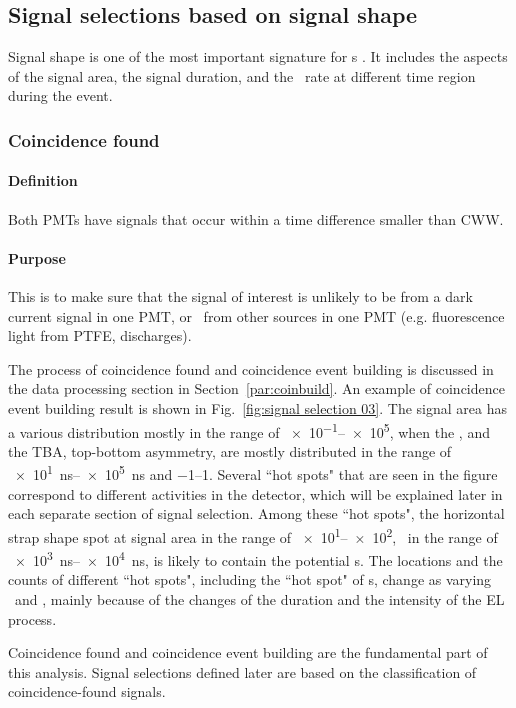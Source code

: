 \subsection{Signal selections based on signal shape}
Signal shape is one of the most important signature for \ees s . It includes the aspects of the signal area, the signal duration, and the \sphe\ rate at different time region during the event.
\subsubsection{Coincidence found}
\label{sec:cuts coindence found}
\paragraph{Definition}
Both PMTs have signals that occur within a time difference smaller than CWW. 
\paragraph{Purpose}
This is to make sure that the signal of interest is unlikely to be from a dark current signal in one PMT, %
or \sphe\ from other sources in one PMT (e.g. fluorescence light from PTFE, discharges). 

The process of coincidence found and coincidence event building is discussed in the data processing section in Section~\ref{par:coinbuild}. An example of coincidence event building result is shown in Fig.~\ref{fig:signal selection 03}. The signal area has a various distribution mostly in the range of \SIrange{e-1}{e5}{\phe}, when the \rpd, and the TBA, top-bottom asymmetry, are mostly distributed in the range of \SIrange{e1}{e5}{\ns} and \numrange{-1}{1}. Several ``hot spots" that are seen in the figure correspond to different activities in the detector, which will be explained later in each separate section of signal selection. Among these ``hot spots", the horizontal strap shape spot at signal area in the range of \SIrange{e1}{e2}{\phe}, \rpd\ in the range of \SIrange{e3}{e4}{\ns}, is likely to contain the potential \ees s. The locations and the counts of  different ``hot spots", including the ``hot spot" of \ees s, change as varying \opdv\ and \opgd , mainly because of the changes of the duration and the intensity of the EL process.  

Coincidence found and coincidence event building are the fundamental part of this analysis. Signal selections defined later are based on the classification of coincidence-found signals. 


